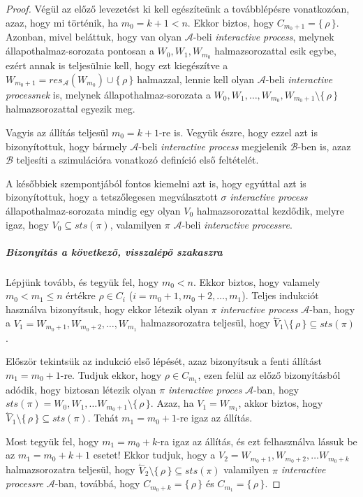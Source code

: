 \documentclass[12pt]{article}
\theoremstyle{definition}
\theoremstyle{remark}
\theoremstyle{plain}
\theoremstyle{remark}
\theoremstyle{plain}
\newcommand{\backwardhat}{\overset{\leftharpoonup}}
\newcommand{\res}{\textit{res}}
\begin{document}
\begin{proof}
        Végül az előző levezetést ki kell egészíteünk a továbblépésre vonatkozóan, azaz, hogy mi történik, ha $m_{0} = k + 1 < n$. Ekkor biztos, hogy $C_{m_{0} + 1} = \{\,\rho\,\}$. Azonban, mivel beláttuk, hogy van olyan $\mathscr{A}$-beli \textit{interactive process}, melynek állapothalmaz-sorozata pontosan a $W_{0}, W_{1}, W_{m_{0}}$ halmazsorozattal esik egybe, ezért annak is teljesülnie kell, hogy ezt kiegészítve a $W_{m_{0} + 1} = \res_{\mathscr{A}}(W_{m_{0}}) \cup \{\,\rho\,\}$ halmazzal, lennie kell olyan $\mathscr{A}$-beli \textit{interactive processnek} is, melynek állapothalmaz-sorozata a $W_{0}, W_{1}, \ldots, W_{m_{0}}, W_{m_{0} + 1} \setminus \{\,\rho\,\}$ halmazsorozattal egyezik meg.

        Vagyis az állítás teljesül $m_{0} = k + 1$-re is. Vegyük észre, hogy ezzel azt is bizonyítottuk, hogy bármely $\mathscr{A}$-beli \textit{interactive process} megjelenik $\mathscr{B}$-ben is, azaz $\mathscr{B}$ teljesíti a szimulációra vonatkozó definíció első feltételét.
        
        A későbbiek szempontjából fontos kiemelni azt is, hogy egyúttal azt is bizonyítottuk, hogy a tetszőlegesen megválasztott $\sigma$ \textit{interactive process} állapothalmaz-sorozata mindig egy olyan $V_{0}$ halmazsorozattal kezdődik, melyre igaz, hogy $V_{0} \subseteq \textit{sts}(\pi)$, valamilyen $\pi$ $\mathscr{A}$-beli \textit{interactive processre}.
        \subparagraph{Bizonyítás a következő, visszalépő szakaszra}
        Lépjünk tovább, és tegyük fel, hogy $m_{0} < n$. Ekkor biztos, hogy valamely $m_{0} < m_{1} \leq n$ értékre $\rho \in C_{i}$ ($i = m_{0} + 1, m_{0} + 2, \ldots, m_{1}$). Teljes indukciót használva bizonyítsuk, hogy ekkor létezik olyan $\pi$ \textit{interactive process} $\mathscr{A}$-ban, hogy a $V_{1} = W_{m_{0} + 1}, W_{m_{0} + 2}, \ldots, W_{m_{1}}$ halmazsorozatra teljesül, hogy $\backwardhat V_{1} \setminus \{\, \rho \,\} \subseteq \textit{sts}(\pi)$.

        Először tekintsük az indukció első lépését, azaz bizonyítsuk a fenti állítást $m_{1} = m_{0} + 1$-re. Tudjuk ekkor, hogy $\rho \in C_{m_{1}}$, ezen felül az előző bizonyításból adódik, hogy biztosan létezik olyan $\pi$ \textit{interactive proces} $\mathscr{A}$-ban, hogy $\textit{sts}(\pi) = W_{0}, W_{1}, \ldots W_{m_{0} + 1} \setminus \{\,\rho\,\}$. Azaz, ha $V_{1} = W_{m_{1}}$, akkor biztos, hogy $\backwardhat V_{1} \setminus \{\,\rho\,\} \subseteq \textit{sts}(\pi)$. Tehát $m_{1} = m_{0} + 1$-re igaz az állítás.
        
        Most tegyük fel, hogy $m_{1} = m_{0} + k$-ra igaz az állítás, és ezt felhasználva lássuk be az $m_{1} = m_{0} + k + 1$ esetet! Ekkor tudjuk, hogy a $V_{2} = W_{m_{0} + 1}, W_{m_{0} + 2}, \ldots W_{m_{0} + k}$ halmazsorozatra teljesül, hogy $\backwardhat V_{2} \setminus \{ \, \rho \, \} \subseteq \textit{sts}(\pi)$ valamilyen $\pi$ \textit{interactive processre} $\mathscr{A}$-ban, továbbá, hogy $C_{m_{0} + k} = \{ \, \rho \, \}$ és $C_{m_{1}} = \{ \, \rho \,\}$.
        

\end{proof}
\end{document}
